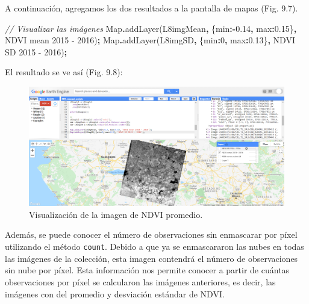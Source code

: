 \documentclass[
  12pt,
  letterpaper,
  twoside]{book}
\newenvironment{Shaded}{\begin{snugshade}}{\end{snugshade}}
\newcommand{\BuiltInTok}[1]{#1}
\newcommand{\CommentTok}[1]{\textcolor[rgb]{0.56,0.35,0.01}{\textit{#1}}}
\newcommand{\DataTypeTok}[1]{\textcolor[rgb]{0.13,0.29,0.53}{#1}}
\newcommand{\DecValTok}[1]{\textcolor[rgb]{0.00,0.00,0.81}{#1}}
\newcommand{\FloatTok}[1]{\textcolor[rgb]{0.00,0.00,0.81}{#1}}
\newcommand{\FunctionTok}[1]{\textcolor[rgb]{0.00,0.00,0.00}{#1}}
\newcommand{\NormalTok}[1]{#1}
\newcommand{\OperatorTok}[1]{\textcolor[rgb]{0.81,0.36,0.00}{\textbf{#1}}}
\newcommand{\StringTok}[1]{\textcolor[rgb]{0.31,0.60,0.02}{#1}}
\begin{document}
A continuación, agregamos los dos resultados a la pantalla de mapas (Fig. 9.7).

\begin{Shaded}
\begin{Highlighting}[]
\CommentTok{// Visualizar las imágenes}
\BuiltInTok{Map}\OperatorTok{.}\FunctionTok{addLayer}\NormalTok{(L8imgMean}\OperatorTok{,}\NormalTok{ \{}\DataTypeTok{min}\OperatorTok{:{-}}\FloatTok{0.14}\OperatorTok{,} \DataTypeTok{max}\OperatorTok{:}\FloatTok{0.15}\NormalTok{\}}\OperatorTok{,} \StringTok{\textquotesingle{}NDVI mean 2015 {-} 2016\textquotesingle{}}\NormalTok{)}\OperatorTok{;}
\BuiltInTok{Map}\OperatorTok{.}\FunctionTok{addLayer}\NormalTok{(L8imgSD}\OperatorTok{,}\NormalTok{ \{}\DataTypeTok{min}\OperatorTok{:}\DecValTok{0}\OperatorTok{,} \DataTypeTok{max}\OperatorTok{:}\FloatTok{0.13}\NormalTok{\}}\OperatorTok{,} \StringTok{\textquotesingle{}NDVI SD 2015 {-} 2016\textquotesingle{}}\NormalTok{)}\OperatorTok{;}
\end{Highlighting}
\end{Shaded}

El resultado se ve así (Fig. 9.8):

\begin{figure}[btp]

{\centering \includegraphics[width=1\linewidth]{Img/imNDVI} 

}

\caption{Visualización de la imagen de NDVI promedio.}\label{fig:unnamed-chunk-164}
\end{figure}

Además, se puede conocer el número de observaciones sin enmascarar por píxel utilizando el método \texttt{count}. Debido a que ya se enmascararon las nubes en todas las imágenes de la colección, esta imagen contendrá el número de observaciones sin nube por píxel. Esta información nos permite conocer a partir de cuántas observaciones por píxel se calcularon las imágenes anteriores, es decir, las imágenes con del promedio y desviación estándar de NDVI.
\end{document}
